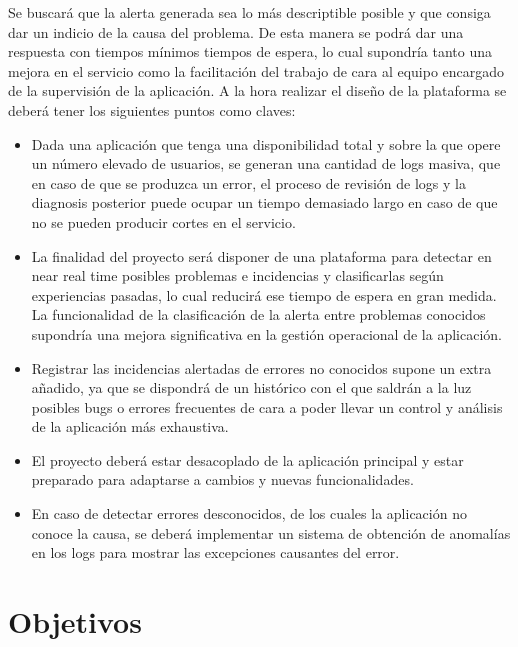 Se buscará que la alerta generada sea lo más descriptible posible y que consiga dar un indicio de la causa del problema. De esta manera se podrá dar una respuesta con tiempos mínimos tiempos de espera, lo cual supondría tanto una mejora en el servicio como la facilitación del trabajo de cara al equipo encargado de la supervisión de la aplicación. A la hora realizar el diseño de la plataforma se deberá tener los siguientes puntos como claves: 

\begin{itemize}
\item Dada una aplicación que tenga una disponibilidad total y sobre la que opere un número elevado de usuarios, se generan una cantidad de logs masiva, que en caso de que se produzca un error, el proceso de revisión de logs y la diagnosis posterior puede ocupar un tiempo demasiado largo en caso de que no se pueden producir cortes en el servicio.

\item La finalidad del proyecto será disponer de una plataforma para detectar en near real time posibles problemas e incidencias y clasificarlas según experiencias pasadas, lo cual reducirá ese tiempo de espera en gran medida. La funcionalidad de la clasificación de la alerta entre problemas conocidos supondría una mejora significativa en la gestión operacional de la aplicación.

\item Registrar las incidencias alertadas de errores no conocidos supone un extra añadido, ya que se dispondrá de un histórico con el que saldrán a la luz posibles bugs o errores frecuentes de cara a poder llevar un control y análisis de la aplicación más exhaustiva.  

\item El proyecto deberá estar desacoplado de la aplicación principal y estar preparado para adaptarse a cambios y nuevas funcionalidades.

\item En caso de detectar errores desconocidos, de los cuales la aplicación no conoce la causa, se deberá implementar un sistema de obtención de anomalías en los logs para mostrar las excepciones causantes del error.

\end{itemize}




\section{Objetivos}

